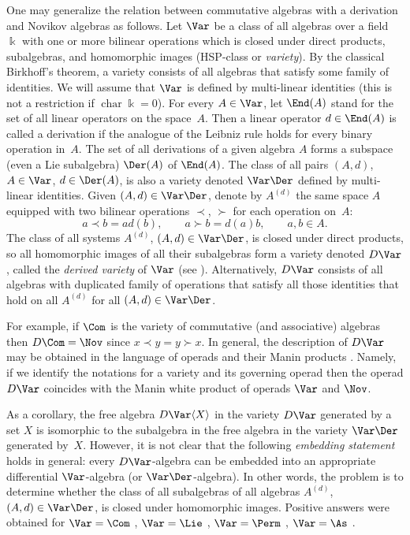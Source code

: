 One may generalize the relation between commutative algebras with a derivation and Novikov algebras as follows.
Let $\Var$ be a class of all algebras over a field $\Bbbk $ with one or more bilinear operations which is closed under direct products, subalgebras, and homomorphic images (HSP-class or {\em variety}).
By the classical Birkhoff's theorem, a variety consists of all algebras
that satisfy some family of identities.
We will assume that $\Var $ is defined by multi-linear identities (this is not a restriction if $\operatorname{char}\Bbbk =0$).
For every $A\in \Var $, let $\End(A)$ stand for the set
of all linear operators on the space~$A$.
Then a linear operator $d\in \End(A)$
is called a derivation if the analogue of the Leibniz rule
holds for every binary operation in~$A$.
The set of all derivations of a given algebra $A$ forms a subspace (even a Lie subalgebra) $\Der(A)$ of $\End(A)$.
The class of all pairs $(A,d)$, $A\in \Var$, $d\in \Der(A)$,
is also a variety denoted $\Var\Der$ defined by multi-linear identities.
Given $(A,d)\in \Var\Der$, denote by
$A^{(d)}$ the same space $A$ equipped with two bilinear operations
$\prec$, $\succ $ for each operation on~$A$:
\[
a\prec b = ad(b),\qquad a\succ b = d(a)b, \qquad a,b\in A.
\]
The class of all systems $A^{(d)}$, $(A,d)\in \Var\Der$,
is closed under direct products, so all homomorphic images of
all their subalgebras form a variety denoted $D\Var$,
called the {\em derived variety} of $\Var $ (see \cite{KSO2019}).
Alternatively, $D\Var $ consists of all algebras with duplicated family
of operations that satisfy all those identities that hold on all $A^{(d)}$
for all $(A,d)\in \Var\Der$.

For example, if $\Com $ is the variety of commutative (and associative) algebras then $D\Com = \Nov$ since
$x\prec y = y\succ x$. In general, the description of
$D\Var $ may be obtained in the language of operads and their
Manin products \cite{KSO2019}. Namely, if we identify the notations
for a variety and its governing operad \cite{GK-1994}
then the operad
$D\Var $ coincides with the Manin white product of operads
$\Var $ and $\Nov $.

As a corollary, the free algebra $D\Var \langle X\rangle $
in the variety $D\Var $ generated by a set $X$
is isomorphic to
the subalgebra in the free algebra in the variety
$\Var\Der$ generated by~$X$. However, it is not clear that
the following {\em embedding statement} holds in general:
 every
$D\Var$-algebra can be embedded into an appropriate
differential $\Var$-algebra (or $\Var\Der$-algebra).
In other words, the problem is to determine whether the
class of all subalgebras of all algebras $A^{(d)}$,
$(A,d)\in \Var\Der$,
is closed under homomorphic images.
Positive answers were obtained
for $\Var =\Com $ \cite{BCZ-2017}, $\Var=\Lie$ \cite{KSO2019}, $\Var=\Perm$ \cite{KS2022}, $\Var=\As$ \cite{SK-2022}.

